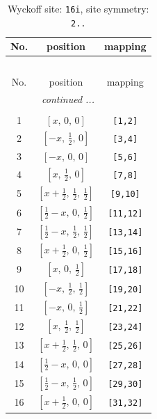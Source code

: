 \documentclass[fleqn,8pt]{jsarticle}
\begin{document}
\renewcommand{\arraystretch}{1.2}
\begin{longtable}{ccc}
\caption{Wyckoff site: {\tt 16i}, site symmetry: {\tt 2..}}
 \\
 \hline \hline
No. & position & mapping \\ \hline \endfirsthead

\multicolumn{2}{l}{\tablename\ \thetable{}} \\
 \hline \hline
No. & position & mapping \\ \hline \endhead

 \hline \hline
\multicolumn{2}{r}{\footnotesize\it continued ...} \\ \endfoot

 \hline \hline
\multicolumn{2}{r}{} \\ \endlastfoot

1 & $\left[ x,\, 0,\, 0 \right]$ & {\tt [1,2]} \\ \hline
2 & $\left[ - x,\, \frac{1}{2},\, 0 \right]$ & {\tt [3,4]} \\ \hline
3 & $\left[ - x,\, 0,\, 0 \right]$ & {\tt [5,6]} \\ \hline
4 & $\left[ x,\, \frac{1}{2},\, 0 \right]$ & {\tt [7,8]} \\ \hline
5 & $\left[ x + \frac{1}{2},\, \frac{1}{2},\, \frac{1}{2} \right]$ & {\tt [9,10]} \\ \hline
6 & $\left[ \frac{1}{2} - x,\, 0,\, \frac{1}{2} \right]$ & {\tt [11,12]} \\ \hline
7 & $\left[ \frac{1}{2} - x,\, \frac{1}{2},\, \frac{1}{2} \right]$ & {\tt [13,14]} \\ \hline
8 & $\left[ x + \frac{1}{2},\, 0,\, \frac{1}{2} \right]$ & {\tt [15,16]} \\ \hline
9 & $\left[ x,\, 0,\, \frac{1}{2} \right]$ & {\tt [17,18]} \\ \hline
10 & $\left[ - x,\, \frac{1}{2},\, \frac{1}{2} \right]$ & {\tt [19,20]} \\ \hline
11 & $\left[ - x,\, 0,\, \frac{1}{2} \right]$ & {\tt [21,22]} \\ \hline
12 & $\left[ x,\, \frac{1}{2},\, \frac{1}{2} \right]$ & {\tt [23,24]} \\ \hline
13 & $\left[ x + \frac{1}{2},\, \frac{1}{2},\, 0 \right]$ & {\tt [25,26]} \\ \hline
14 & $\left[ \frac{1}{2} - x,\, 0,\, 0 \right]$ & {\tt [27,28]} \\ \hline
15 & $\left[ \frac{1}{2} - x,\, \frac{1}{2},\, 0 \right]$ & {\tt [29,30]} \\ \hline
16 & $\left[ x + \frac{1}{2},\, 0,\, 0 \right]$ & {\tt [31,32]} \\
\end{longtable}
\end{document}
